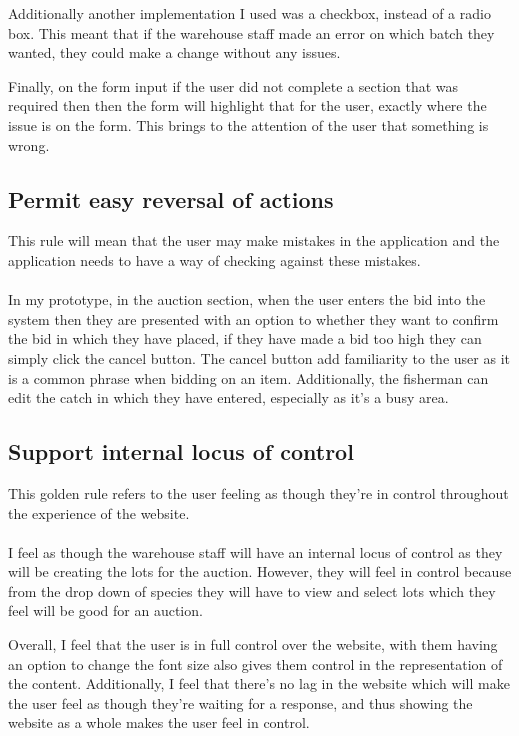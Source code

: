 \documentclass{article}
\begin{document}
Additionally another implementation I used was a checkbox, instead of a radio box. This meant that if the warehouse staff made an error on which batch they wanted, they could make a change without any issues.

Finally, on the form input if the user did not complete a section that was required then then the form will highlight that for the user, exactly where the issue is on the form. This brings to the attention of the user that something is wrong. 
\subsection{Permit easy reversal of actions}
This rule will mean that the user may make mistakes in the application and the application needs to have a way of checking against these mistakes.
\\ \\ 
In my prototype, in the auction section, when the user enters the bid into the system then they are presented with an option to whether they want to confirm the bid in which they have placed, if they have made a bid too high they can simply click the cancel button. The cancel button add familiarity to the user as it is a common phrase when bidding on an item. Additionally, the fisherman can edit the catch in which they have entered, especially as it's a busy area.  
\subsection{Support internal locus of control}
This golden rule refers to the user feeling as though they're in control throughout the experience of the website. 
\\ \\
I feel as though the warehouse staff will have an internal locus of control as they will be creating the lots for the auction. However, they will feel in control because from the drop down of species they will have to view and select lots which they feel will be good for an auction.

Overall, I feel that the user is in full control over the website, with them having an option to change the font size also gives them control in the representation of the content. Additionally, I feel that there's no lag in the website which will make the user feel as though they're waiting for a response, and thus showing the website as a whole makes the user feel in control.
\end{document}
